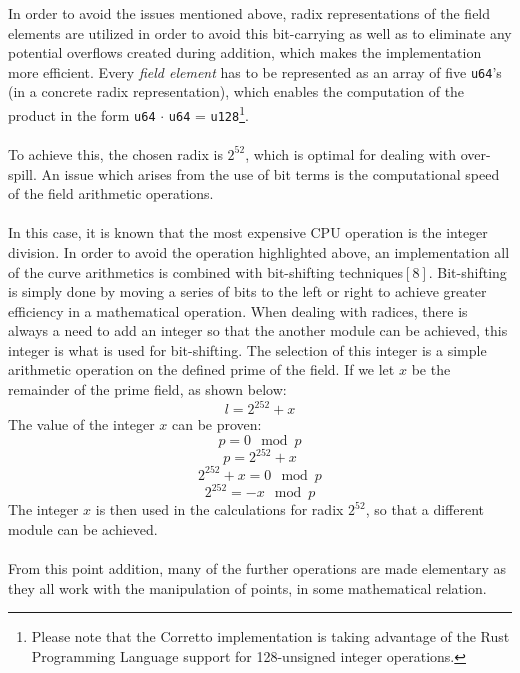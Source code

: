 \documentclass{article}
\begin{document}
In order to avoid the issues mentioned above, radix representations of the field elements are utilized in order to avoid this bit-carrying as well as to eliminate any potential overflows created during addition, which makes the implementation more efficient. Every \textit{field element} has to be represented as an array of five \texttt{u64}'s (in a concrete radix representation), which enables the computation of the product in the form \texttt{u64} $\cdot$ \texttt{u64} = \texttt{u128}\footnote{Please note that the Corretto implementation is taking advantage of the Rust Programming Language support for 128-unsigned integer operations.}.
\\\\
To achieve this, the chosen radix is $2^{52}$, which is optimal for dealing with over-spill. An issue which arises from the use of bit terms is the computational speed of the field arithmetic operations. \\\\
In this case, it is known that the most expensive CPU operation is the integer division. In order to avoid the operation highlighted above, an implementation all of the curve arithmetics is combined with bit-shifting techniques$[8]$. Bit-shifting is simply done by moving a series of bits to the left or right to achieve greater efficiency in a mathematical operation. When dealing with radices, there is always a need to add an integer so that the another module can be achieved, this integer is what is used for bit-shifting. The selection of this integer is a simple arithmetic operation on the defined prime of the field. 
If we let $x$ be the remainder of the prime field, as shown below:
$$ l = 2^{252}+x $$
The value of the integer $x$ can be proven:
$$ p = 0\mod p$$  
$$ p = 2^{252}+x $$
$$ 2^{252}+x = 0\mod p $$
$$ 2^{252} = -x\mod p $$
The integer $x$ is then used in the calculations for radix $2^{52}$, so that a different module can be achieved. \\\\
From this point addition, many of the further operations are made elementary as they all work with the manipulation of points, in some mathematical relation.  


\newpage
\end{document}
